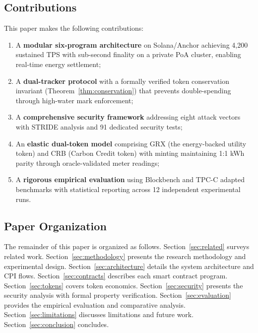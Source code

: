 \documentclass[conference]{IEEEtran}
\begin{document}
\subsection{Contributions}

This paper makes the following contributions:

\begin{enumerate}
    \item A \textbf{modular six-program architecture} on Solana/Anchor achieving 4,200 sustained TPS with sub-second finality on a private PoA cluster, enabling real-time energy settlement;
    \item A \textbf{dual-tracker protocol} with a formally verified token conservation invariant (Theorem~\ref{thm:conservation}) that prevents double-spending through high-water mark enforcement;
    \item A \textbf{comprehensive security framework} addressing eight attack vectors with STRIDE analysis and 91 dedicated security tests;
    \item An \textbf{elastic dual-token model} comprising GRX (the energy-backed utility token) and CRB (Carbon Credit token) with minting maintaining 1:1 kWh parity through oracle-validated meter readings;
    \item A \textbf{rigorous empirical evaluation} using Blockbench and TPC-C adapted benchmarks with statistical reporting across 12 independent experimental runs.
\end{enumerate}

\subsection{Paper Organization}

The remainder of this paper is organized as follows. Section~\ref{sec:related} surveys related work. Section~\ref{sec:methodology} presents the research methodology and experimental design. Section~\ref{sec:architecture} details the system architecture and CPI flows. Section~\ref{sec:contracts} describes each smart contract program. Section~\ref{sec:tokens} covers token economics. Section~\ref{sec:security} presents the security analysis with formal property verification. Section~\ref{sec:evaluation} provides the empirical evaluation and comparative analysis. Section~\ref{sec:limitations} discusses limitations and future work. Section~\ref{sec:conclusion} concludes.

\end{document}
